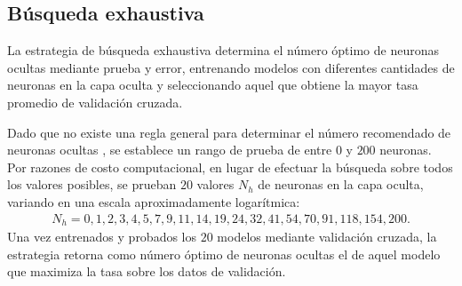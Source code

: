 %
\subsection{Búsqueda exhaustiva}
%
La estrategia de búsqueda exhaustiva determina el número óptimo de
neuronas ocultas mediante prueba y error, entrenando modelos con
diferentes cantidades de neuronas en la capa oculta y seleccionando
aquel que obtiene la mayor tasa \GM{} promedio de validación cruzada.

Dado que no existe una regla general para determinar el número
recomendado de neuronas ocultas \cite{nnfaq3}, se establece un rango
de prueba de entre $0$ y $200$ neuronas.
Por razones de costo computacional, en lugar de efectuar la búsqueda
sobre todos los valores posibles, se prueban $20$ valores $N_h$ de
neuronas en la capa oculta, variando en una escala aproximadamente
logarítmica:
%
\begin{align}
  \label{mlp-hidden-tries}
  N_h=0,1,2,3,4,5,7,9,11,14,19,24,32,41,54,70,91,118,154,200.
\end{align}
%
Una vez entrenados y probados los $20$ modelos mediante validación
cruzada, la estrategia retorna como número óptimo de neuronas ocultas
el de aquel modelo que maximiza la tasa \GM{} sobre los datos de
validación.
